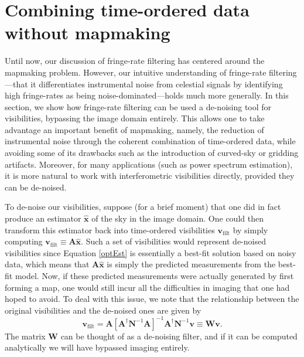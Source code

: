 \documentclass[twocolumn,apj,numberedappendix]{emulateapj}
\newcommand{\vis}{\mathbf{v}}
\newcommand{\xhat}{\hat{\mathbf{x}}}
\newcommand{\A}{\mathbf{A}}
\newcommand{\N}{\mathbf{N}}
\begin{document}
\section{Combining time-ordered data without mapmaking}
Until now, our discussion of fringe-rate filtering has centered around the mapmaking problem.  However, our intuitive understanding of fringe-rate filtering---that it differentiates instrumental noise from celestial signals by identifying high fringe-rates as being noise-dominated---holds much more generally.    In this section, we show how fringe-rate filtering can be used a de-noising tool for visibilities, bypassing the image domain entirely.  This allows one to take advantage an important benefit of mapmaking, namely, the reduction of instrumental noise through the coherent combination of time-ordered data, while avoiding some of its drawbacks such as the introduction of curved-sky or gridding artifacts.  Moreover, for many applications (such as power spectrum estimation), it is more natural to work with interferometric visibilities directly, provided they can be de-noised.

To de-noise our visibilities, suppose (for a brief moment) that one did in fact produce an estimator $\xhat$ of the sky in the image domain.  One could then transform this estimator back into time-ordered visibilities $\vis_\textrm{filt}$ by simply computing $\vis_\textrm{filt} \equiv \A \xhat$.  Such a set of visibilities would represent de-noised visibilities since Equation \eqref{optEst} is essentially a best-fit solution based on noisy data, which means that $\A \xhat$ is simply the predicted measurements from the best-fit model.  Now, if these predicted measurements were actually generated by first forming a map, one would still incur all the difficulties in imaging that one had hoped to avoid.  To deal with this issue, we note that the relationship between the original visibilities and the de-noised ones are given by
\begin{equation}
\vis_\textrm{filt} = \A \left[ \A^\dagger \N^{-1} \A \right]^{-1} \A^\dagger \N^{-1} \vis \equiv \mathbf{W}  \vis.
\end{equation}
The matrix $\mathbf{W}$ can be thought of as a de-noising filter, and if it can be computed analytically we will have bypassed imaging entirely.
\end{document}
